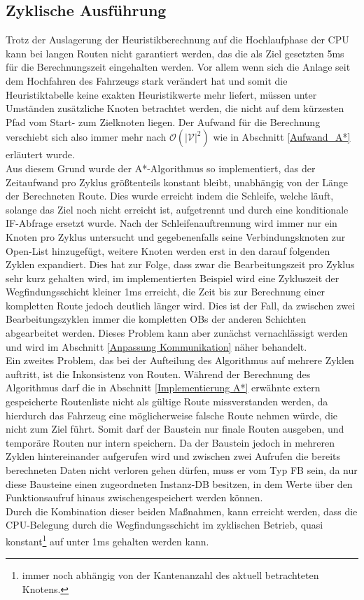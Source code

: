 		\subsection{Zyklische Ausführung}
		
			Trotz der Auslagerung der Heuristikberechnung auf die Hochlaufphase der CPU kann bei langen Routen nicht garantiert werden, das die als Ziel gesetzten 5ms für die Berechnungszeit eingehalten werden. Vor allem wenn sich die Anlage seit dem Hochfahren des Fahrzeugs stark verändert hat und somit die Heuristiktabelle keine exakten Heuristikwerte mehr liefert, müssen unter Umständen zusätzliche Knoten betrachtet werden, die nicht auf dem kürzesten Pfad vom Start- zum Zielknoten liegen. Der Aufwand für die Berechnung verschiebt sich also immer mehr nach $\mathcal{O}(|\mathcal{V}|^2)$ wie in Abschnitt \ref{Aufwand_A*} erläutert wurde.\\
			
			Aus diesem Grund wurde der A*-Algorithmus so implementiert, das der Zeitaufwand pro Zyklus größtenteils konstant bleibt, unabhängig von der Länge der Berechneten Route. Dies wurde erreicht indem die Schleife, welche läuft, solange das Ziel noch nicht erreicht ist, aufgetrennt und durch eine konditionale IF-Abfrage ersetzt wurde. Nach der Schleifenauftrennung wird immer nur ein Knoten pro Zyklus untersucht und gegebenenfalls seine Verbindungsknoten zur Open-List hinzugefügt, weitere Knoten werden erst in den darauf folgenden Zyklen expandiert. Dies hat zur Folge, dass zwar die Bearbeitungszeit pro Zyklus sehr kurz gehalten wird, im implementierten Beispiel wird eine Zykluszeit der Wegfindungsschicht kleiner 1ms erreicht, die Zeit bis zur Berechnung einer kompletten Route jedoch deutlich länger wird. Dies  ist der Fall, da zwischen zwei Bearbeitungszyklen immer die kompletten \ac{OB}s der anderen Schichten abgearbeitet werden. Dieses Problem kann aber zunächst vernachlässigt werden und wird im Abschnitt \ref{Anpassung Kommunikation} näher behandelt.
			\\
			Ein zweites Problem, das bei der Aufteilung des Algorithmus auf mehrere Zyklen auftritt, ist die Inkonsistenz von Routen. Während der Berechnung des Algorithmus darf die in Abschnitt \ref{Implementierung A*} erwähnte extern gespeicherte Routenliste nicht als gültige Route missverstanden werden, da hierdurch das Fahrzeug eine möglicherweise falsche Route nehmen würde, die nicht zum Ziel führt. Somit darf der Baustein nur finale Routen ausgeben, und temporäre Routen nur intern speichern. Da der Baustein jedoch in mehreren Zyklen hintereinander aufgerufen wird und zwischen zwei Aufrufen die bereits berechneten Daten nicht verloren gehen dürfen, muss er vom Typ \ac{FB} sein, da nur diese Bausteine einen zugeordneten Instanz-\acl{DB} besitzen, in dem Werte über den Funktionsaufruf hinaus zwischengespeichert werden können.
			\\
			Durch die Kombination dieser beiden Maßnahmen, kann erreicht werden, dass die CPU-Belegung durch die Wegfindungsschicht im zyklischen Betrieb, quasi konstant\footnote{immer noch abhängig von der Kantenanzahl des aktuell betrachteten Knotens.} auf unter 1ms gehalten werden kann.
		
